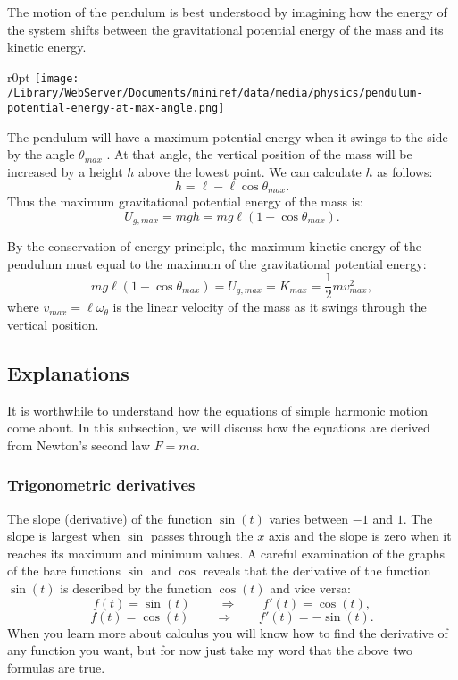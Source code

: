 \documentclass[letterpaper,9pt,journal]{IEEEtran}
\begin{document}
The motion of the pendulum is best understood by imagining how the energy of the
system shifts between the gravitational potential energy of the mass and its kinetic energy.

\begin{wrapfigure}{r}{0pt}
\texttt{[image: /Library/WebServer/Documents/miniref/data/media/physics/pendulum-potential-energy-at-max-angle.png]}
\end{wrapfigure}

The pendulum will have a maximum potential energy when it swings to the side by the angle $\theta_{max}$ .
At that angle, the vertical position of the mass will be increased by a height $h$ above the lowest point.
We can calculate $h$ as follows:
\[
 h = \ell - \ell \cos \theta_{max}.
\]
Thus the maximum gravitational potential energy of the mass is:
\[
 U_{g,max}= mgh= mg\ell(1-\cos\theta_{max}).
\]

By the conservation of energy principle, the maximum kinetic energy of the
pendulum must equal to the maximum of the gravitational potential energy:
\[
 mg\ell(1-\cos\theta_{max}) = U_{g,max} = K_{max} = \frac{1}{2} mv_{max}^2,
\]
where $v_{max}=\ell \omega_\theta$ is the linear velocity of the mass as it swings
through the vertical position.


\subsection{Explanations}
\label{678d5f6d14642c24a1e4bceffedbe407}%

It is worthwhile to understand how the equations of simple harmonic motion come about. 
In this subsection, we will discuss how the equations are derived from Newton's second law $F=ma$.


\subsubsection{Trigonometric derivatives}

The slope (derivative) of the function $\sin(t)$ varies between $-1$ and $1$.
The slope is largest when $\sin$ passes through the $x$ axis and the slope is
zero when it reaches its maximum and minimum values. 
A careful examination of the graphs of the bare functions $\sin$ and $\cos$
reveals that the derivative of the function $\sin(t)$ is described by the 
function $\cos(t)$ and vice versa:
\[
 f(t) = \sin(t) \:\qquad \Rightarrow \qquad f'(t) = \cos(t),
\]
\[
 f(t) = \cos(t) \qquad \Rightarrow \qquad f'(t) = -\sin(t).
\]
When you learn more about calculus you will know how to find the derivative 
of any function you want, but for now just take my word that the above two
formulas are true.
\end{document}
